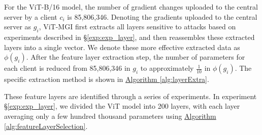 \documentclass[conference]{IEEEtran}
\begin{document}

For the ViT-B/16 model, the number of gradient changes uploaded to the central server by a client $c_i$ is 85,806,346. Denoting the gradients uploaded to the central server as $g_i$, ViT-MGI first extracts all layers sensitive to attacks based on experiments described in \hyperref[exp:exp_layer]{§\ref{exp:exp_layer}}, and then reassembles these extracted layers into a single vector. We denote these more effective extracted data as $\phi(g_i)$. After the feature layer extraction step, the number of parameters for each client is reduced from 85,806,346 in $g_i$ to approximately $\frac1{10}$ in $\phi(g_i)$. The specific extraction method is shown in \hyperref[alg:layerExtra]{Algorithm \ref{alg:layerExtra}}.

These feature layers are identified through a series of experiments. In experiment \hyperref[exp:exp_layer]{§\ref{exp:exp_layer}}, we divided the ViT model into 200 layers, with each layer averaging only a few hundred thousand parameters using \hyperref[alg:featureLayerSelection]{Algorithm \ref{alg:featureLayerSelection}}.


\end{document}
